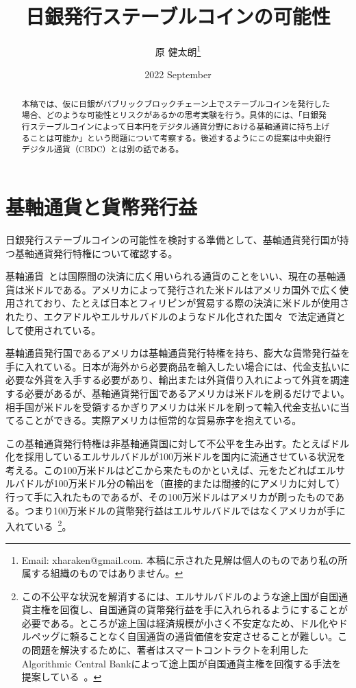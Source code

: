 \documentclass[dvipdfmx,a4paper]{jsarticle}
\title{\textbf{日銀発行ステーブルコインの可能性}}
\author{原 健太朗\footnote{Email: xharaken@gmail.com. 本稿に示された見解は個人のものであり私の所属する組織のものではありません。}}
\date{2022 September}
\begin{document}
\maketitle

\begin{abstract}

本稿では、仮に日銀がパブリックブロックチェーン上でステーブルコインを発行した場合、どのような可能性とリスクがあるかの思考実験を行う。具体的には、「日銀発行ステーブルコインによって日本円をデジタル通貨分野における基軸通貨に持ち上げることは可能か」という問題について考察する。後述するようにこの提案は中央銀行デジタル通貨（CBDC）とは別の話である。

\end{abstract}

\section{基軸通貨と貨幣発行益}

日銀発行ステーブルコインの可能性を検討する準備として、基軸通貨発行国が持つ基軸通貨発行特権について確認する。

基軸通貨~\cite{monetarytheory,robert2004international}とは国際間の決済に広く用いられる通貨のことをいい、現在の基軸通貨は米ドルである。アメリカによって発行された米ドルはアメリカ国外で広く使用されており、たとえば日本とフィリピンが貿易する際の決済に米ドルが使用されたり、エクアドルやエルサルバドルのようなドル化された国々~\cite{calvo2002dollarization,selgin2005currency}で法定通貨として使用されている。

基軸通貨発行国であるアメリカは基軸通貨発行特権を持ち、膨大な貨幣発行益を手に入れている。日本が海外から必要商品を輸入したい場合には、代金支払いに必要な外貨を入手する必要があり、輸出または外貨借り入れによって外貨を調達する必要があるが、基軸通貨発行国であるアメリカは米ドルを刷るだけでよい。相手国が米ドルを受領するかぎりアメリカは米ドルを刷って輸入代金支払いに当てることができる。実際アメリカは恒常的な貿易赤字を抱えている。

この基軸通貨発行特権は非基軸通貨国に対して不公平を生み出す。たとえばドル化を採用しているエルサルバドルが100万米ドルを国内に流通させている状況を考える。この100万米ドルはどこから来たものかといえば、元をたどればエルサルバドルが100万米ドル分の輸出を（直接的または間接的にアメリカに対して）行って手に入れたものであるが、その100万米ドルはアメリカが刷ったものである。つまり100万米ドルの貨幣発行益はエルサルバドルではなくアメリカが手に入れている~\footnote{この不公平な状況を解消するには、エルサルバドルのような途上国が自国通貨主権を回復し、自国通貨の貨幣発行益を手に入れられるようにすることが必要である。ところが途上国は経済規模が小さく不安定なため、ドル化やドルペッグに頼ることなく自国通貨の通貨価値を安定させることが難しい。この問題を解決するために、著者はスマートコントラクトを利用したAlgorithmic Central Bankによって途上国が自国通貨主権を回復する手法を提案している~\cite{johnlawcoinacb}。}。
\end{document}
